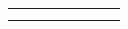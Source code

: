 \documentclass[12pt]{article}
\begin{document}
{\begin{landscape}
\begin{xltabular}{\linewidth}{|p{3cm}|p{1cm}|p{3.25cm}|p{3.25cm}|p{3cm}|p{3cm}|p{4cm}|X|}
\hline
{} & {} & {} & {} & {} & {} & {}& {}\\

\hline
{} & {} & {} & {} & {} & {} & {}& {}\\

\hline
{} & {} & {} & {} & {} & {} & {}& {}\\


\end{xltabular}
\end{landscape}
\clearpage%
}
\end{document}
